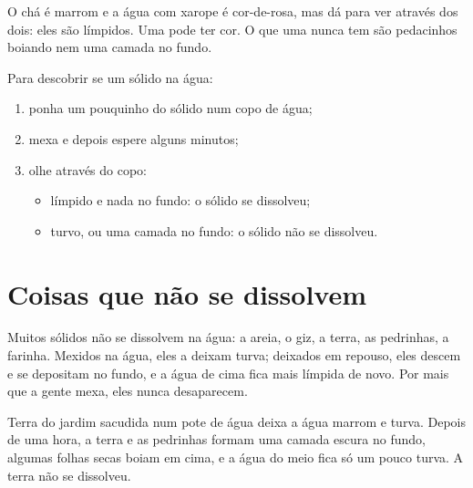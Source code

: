 \begin{remark}\label{rem:g2:mixing-and-dissolving:clear}
O chá é marrom e a água com xarope é cor-de-rosa, mas dá para ver
através dos dois: eles são límpidos. Uma  pode ter cor. O que uma
 nunca tem são pedacinhos boiando nem uma camada no fundo.
\end{remark}

\begin{method}\label{met:g2:mixing-and-dissolving:test}
Para descobrir se um sólido  na água:
\begin{enumerate}
  \item ponha um pouquinho do sólido num copo de água;
  \item mexa e depois espere alguns minutos;
  \item olhe através do copo:
    \begin{itemize}
      \item límpido e nada no fundo: o sólido se dissolveu;
      \item turvo, ou uma camada no fundo: o sólido não se dissolveu.
    \end{itemize}
\end{enumerate}
\end{method}

\section{Coisas que não se dissolvem}

\begin{proposition}\label{prop:g2:mixing-and-dissolving:not}
Muitos sólidos não se dissolvem na água: a areia, o giz, a terra, as
pedrinhas, a farinha. Mexidos na água, eles a deixam turva; deixados em
repouso, eles descem e se depositam no fundo, e a água de cima fica mais
límpida de novo. Por mais que a gente mexa, eles nunca desaparecem.
\end{proposition}

\begin{example}\label{ex:g2:mixing-and-dissolving:mud}
Terra do jardim sacudida num pote de água deixa a água marrom e turva.
Depois de uma hora, a terra e as pedrinhas formam uma camada escura no
fundo, algumas folhas secas boiam em cima, e a água do meio fica só um
pouco turva. A terra não se dissolveu.
\end{example}

